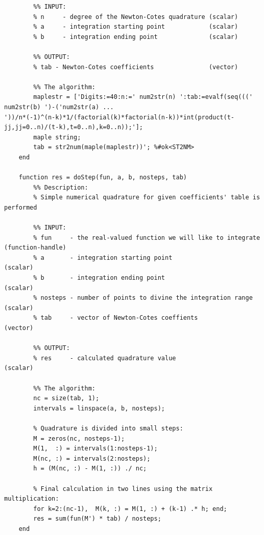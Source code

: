 \documentclass[12pt,twoside,a4paper]{article}
\numberwithin{equation}{subsection}
\numberwithin{figure}{subsection}
\begin{document}
\begin{lstlisting}
	    %% INPUT:
	    % n     - degree of the Newton-Cotes quadrature (scalar) 
	    % a     - integration starting point            (scalar)
	    % b     - integration ending point              (scalar)
	    
	    %% OUTPUT:
	    % tab - Newton-Cotes coefficients               (vector)
	    
	    %% The algorithm:
	    maplestr = ['Digits:=40:n:=' num2str(n) ':tab:=evalf(seq(((' num2str(b) ')-('num2str(a) ...
'))/n*(-1)^(n-k)*1/(factorial(k)*factorial(n-k))*int(product(t-jj,jj=0..n)/(t-k),t=0..n),k=0..n));'];
	    maple string;
	    tab = str2num(maple(maplestr))'; %#ok<ST2NM>
	end
	
	function res = doStep(fun, a, b, nosteps, tab)
	    %% Description:
	    % Simple numerical quadrature for given coefficients' table is performed
	    
	    %% INPUT:
	    % fun     - the real-valued function we will like to integrate (function-handle)
	    % a       - integration starting point                         (scalar)
	    % b       - integration ending point                           (scalar)
	    % nosteps - number of points to divine the integration range   (scalar)
	    % tab     - vector of Newton-Cotes coeffients                  (vector) 
	    
	    %% OUTPUT:
	    % res     - calculated quadrature value                        (scalar)
	
	    %% The algorithm:
	    nc = size(tab, 1);
	    intervals = linspace(a, b, nosteps);
	    
	    % Quadrature is divided into small steps:
	    M = zeros(nc, nosteps-1);
	    M(1,  :) = intervals(1:nosteps-1);
	    M(nc, :) = intervals(2:nosteps);
	    h = (M(nc, :) - M(1, :)) ./ nc;
	    
	    % Final calculation in two lines using the matrix multiplication:
	    for k=2:(nc-1),  M(k, :) = M(1, :) + (k-1) .* h; end;
	    res = sum(fun(M') * tab) / nosteps;
	end
\end{lstlisting}
\end{document}

